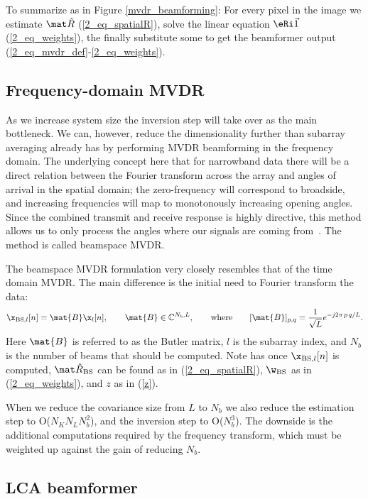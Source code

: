 {To summarize as in Figure \ref{mvdr_beamforming}: For every pixel in the image we estimate $\eR$ (\ref{2_eq_spatialR}), solve the linear equation $\eRi\1$ (\ref{2_eq_weights}), the finally substitute some to get the beamformer output (\ref{2_eq_mvdr_def}-\ref{2_eq_weights}).



\subsection{Frequency-domain MVDR}

As we increase system size the inversion step will take over as the main bottleneck. We can, however, reduce the dimensionality further than subarray averaging already has by performing MVDR beamforming in the frequency domain. The underlying concept here that for narrowband data there will be a direct relation between the Fourier transform across the array and angles of arrival in the spatial domain; the zero-frequency will correspond to broadside, and increasing frequencies will map to monotonously increasing opening angles. Since the combined transmit and receive response is highly directive, this method allows us to only process the angles where our signals are coming from~\cite{Nilsen2009a,VanTrees2002}. The method is called beamspace MVDR.

The beamspace MVDR formulation very closely resembles that of the time domain MVDR. The main difference is the initial need to Fourier transform the data:
%
\begin{gather}
\x_{\text{BS},l}[n] = \mat{B}\x_l[n], \qquad \mat{B}\in \mathbb{C}^{N_b,L}, \qquad \text{where} \qquad [\mat{B}]_{p,q} = \frac{1}{\sqrt{L}} e^{-j2\pi\,p\,q/L}.\label{2_eq_beamspace}
\end{gather}
%
Here $\mat{B}$ is referred to as the Butler matrix, $l$ is the subarray index, and $N_b$ is the number of beams that should be computed. Note has once $\x_{\text{BS},l}[n]$ is computed, $\eR_\text{BS}$ can be found as in (\ref{2_eq_spatialR}), $\w_\text{BS}$ as in (\ref{2_eq_weights}), and $z$ as in (\ref{z}).

When we reduce the covariance size from $L$ to $N_b$ we also reduce the estimation step to O($N_K N_L N_b^2$), and the inversion step to O($N_b^3$). The downside is the additional computations required by the frequency transform, which must be weighted up against the gain of reducing $N_b$.



\subsection{LCA beamformer}

}
